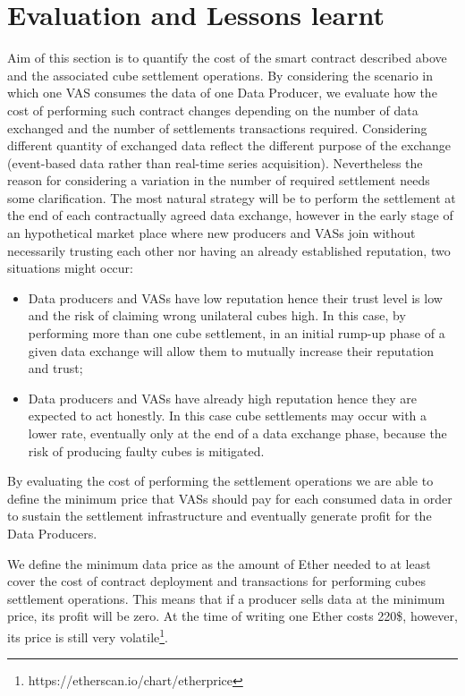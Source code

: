 \section{Evaluation and Lessons learnt}
\label{sec:evaluation}
Aim of this section is to quantify the cost of the smart contract described above and the associated cube settlement operations. By considering the scenario in which one VAS consumes the data of one Data Producer, we evaluate how the cost of performing such contract changes depending on the number of data exchanged and the number of settlements transactions required. Considering different quantity of exchanged data reflect the different purpose of the exchange (event-based data rather than real-time series acquisition). Nevertheless the reason for considering a variation in the number of required settlement needs some clarification. The most natural strategy will be to perform the settlement at the end of each contractually agreed data exchange, however in the early stage of an hypothetical market place where new producers and VASs join without necessarily trusting each other nor having an already established reputation, two situations might occur:
\begin{itemize}
	\item {Data producers and VASs have low reputation hence their trust level is low and the risk of claiming wrong unilateral cubes high. In this case, by performing more than one cube settlement, in an initial rump-up phase of a given data exchange will allow them to mutually increase their reputation and trust;}
	\item {Data producers and VASs have already high reputation hence they are expected to act honestly. In this case cube settlements may occur with a lower rate, eventually only at the end of a data exchange phase, because the risk of producing faulty cubes is mitigated.}
\end{itemize}

By evaluating the cost of performing the settlement operations we are able to define the minimum price that VASs should pay for each consumed data in order to sustain the settlement infrastructure and eventually generate profit for the Data Producers.

We define the minimum data price as the amount of Ether needed to at least cover the cost of contract deployment and transactions for performing cubes settlement operations. This means that if a producer sells data at the minimum price, its profit will be zero. 
At the time of writing one Ether costs 220\$, however, its price is still very volatile\footnote{https://etherscan.io/chart/etherprice}.

